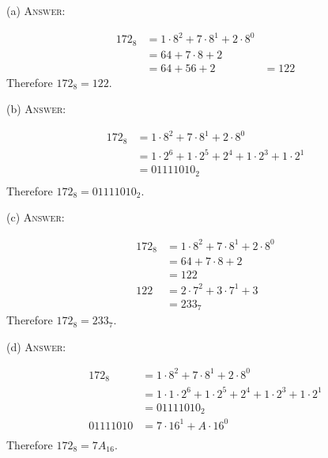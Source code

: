(a)
\textsc{Answer:}\vspace{-2mm}
\begin{answerlong}
\begin{align*}
172_8 &= 1 \cdot 8^{2} + 7 \cdot 8^{1} + 2 \cdot 8^{0} \\
      &= 64 + 7 \cdot 8 + 2 \\
      &= 64 + 56 + 2
      &= 122
\end{align*}
Therefore $172_{8} = 122$.
\end{answerlong}

(b)
\textsc{Answer:}\vspace{-2mm}
\begin{answerlong}
\begin{align*}
172_8 &= 1 \cdot 8^{2} + 7 \cdot 8^{1} + 2 \cdot 8^{0} \\
      &= 1 \cdot 2^{6} + 1 \cdot 2^{5} + 2^{4} + 1 \cdot 2^{3} + 1 \cdot 2^{1} \\
      &= 01111010_{2} \\
\end{align*}
Therefore $172_{8} = 01111010_{2}$.
\end{answerlong}

(c)
\textsc{Answer:}\vspace{-2mm}
\begin{answerlong}
\begin{align*}
172_8 &= 1 \cdot 8^{2} + 7 \cdot 8^{1} + 2 \cdot 8^{0} \\
      &= 64 + 7 \cdot 8 + 2 \\
      &= 122 \\
  122 &= 2 \cdot 7^{2} + 3 \cdot 7^{1} + 3 \\
      &= 233_{7}
\end{align*}
Therefore $172_{8} = 233_{7}$.
\end{answerlong}

(d)
\textsc{Answer:}\vspace{-2mm}
\begin{answerlong}
\begin{align*}
    172_8 &= 1 \cdot 8^{2} + 7 \cdot 8^{1} + 2 \cdot 8^{0} \\
          &= 1 \cdot 1 \cdot 2^{6} + 1 \cdot 2^{5} + 2^{4} + 1 \cdot 2^{3} + 1 \cdot 2^{1} \\
          &= 0111 1010_{2} \\
0111 1010 &= 7 \cdot 16^{1} + A \cdot 16^{0} \\
\end{align*}
Therefore $172_{8} = 7A_{16}$.
\end{answerlong}
